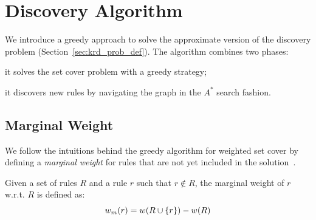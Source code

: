 \section{Discovery Algorithm} \label{sec:krd_greedy}
We introduce a greedy approach to solve the approximate version of the discovery problem (Section~\ref{sec:krd_prob_def}). The algorithm combines two phases:
\begin{inparaenum}[\itshape(i)]
	\item it solves the set cover problem with a greedy strategy;
	\item it discovers new rules by navigating the graph in the $A^*$ search fashion.
\end{inparaenum}

\vspace{-1ex}
\subsection{Marginal Weight}
\vspace{-1ex}
We follow the intuitions behind the greedy algorithm for weighted set cover by defining a \emph{marginal weight} for rules that are not yet included in the solution~\cite{chvatal1979greedy}.

\begin{definition}
	Given a set of rules $R$ and a rule $r$ such that $r \notin R$, the marginal weight of $r$ w.r.t. $R$ is defined as:
	\begin{equation*} \label{eq:mar_weight}
	w_m(r) = w(R \cup \{r\}) - w(R) 
		\vspace{-0.5ex}
	\end{equation*}
\end{definition}

